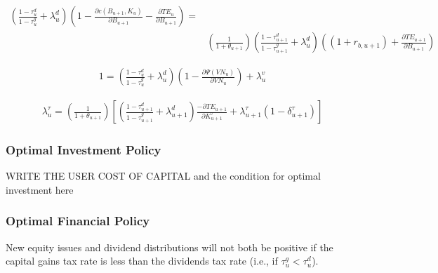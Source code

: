  \begin{equation}
\label{eqn:foc_b_tax}
\begin{split}
 \left(\frac{1-\tau^{d}_{u}}{1-\tau^{g}_{u}} + \lambda^{d}_{u} \right)\left(1-\frac{\partial c(B_{u+1},K_{u})}{\partial B_{u+1}}-\frac{\partial TE_{u}}{\partial B_{u+1}}\right)= \\
&  \left(\frac{1}{1+\theta_{u+1}}\right) \left(\frac{1-\tau^{d}_{u+1}}{1-\tau^{g}_{u+1}} + \lambda^{d}_{u} \right) \left((1+r_{b,u+1})+\frac{\partial TE_{u+1}}{\partial B_{u+1}}\right)
 \end{split}
\end{equation}

 \begin{equation}
\label{eqn:foc_vn_tax}
\begin{split}
1 = \left(\frac{1-\tau^{d}_{u}}{1-\tau^{g}_{u}} + \lambda^{d}_{u}\right)\left(1-\frac{\partial \Psi(VN_{u})}{\partial VN_{u}}\right) + \lambda^{v}_{u}
 \end{split}
\end{equation}

 \begin{equation}
\label{eqn:foc_ktau_tax}
\begin{split}
 \lambda^{\tau}_{u} = \left(\frac{1}{1+\theta_{u+1}}\right)\left[\left(\frac{1-\tau^{d}_{u+1}}{1-\tau^{g}_{u+1}} + \lambda^{d}_{u+1} \right)\frac{- \partial TE_{u+1}}{\partial K^{\tau}_{u+1}} + \lambda^{\tau}_{u+1}(1-\delta^{\tau}_{u+1})\right] 
 \end{split}
\end{equation}



\subsubsection{Optimal Investment Policy}

WRITE THE USER COST OF CAPITAL and the condition for optimal investment here


\subsubsection{Optimal Financial Policy}

\begin{proposition}
\label{prop:vn_div}
New equity issues and dividend distributions will not both be positive if the capital gains tax rate is less than the dividends tax rate (i.e., if $\tau^{g}_{u}<\tau^{d}_{u}$).
\end{proposition}

